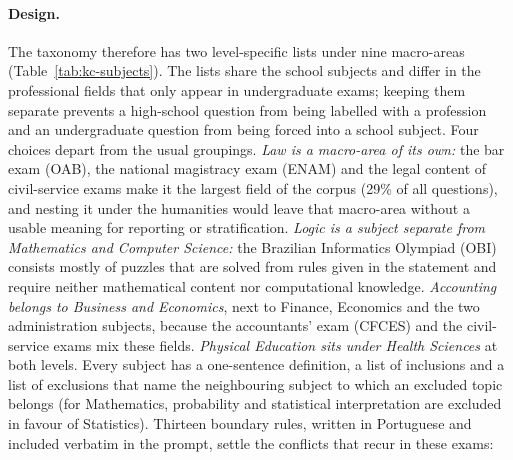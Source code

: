 \paragraph{Design.} The taxonomy therefore has two level-specific lists under
nine macro-areas (Table~\ref{tab:kc-subjects}). The lists share the school
subjects and differ in the professional fields that only appear in
undergraduate exams; keeping them separate prevents a high-school question
from being labelled with a profession and an undergraduate question from
being forced into a school subject. Four choices depart from the usual
groupings. \emph{Law is a macro-area of its own:} the bar exam (OAB), the
national magistracy exam (ENAM) and the legal content of civil-service exams
make it the largest field of the corpus (29\% of all questions), and nesting
it under the humanities would leave that macro-area without a usable meaning
for reporting or stratification. \emph{Logic is a subject separate from
Mathematics and Computer Science:} the Brazilian Informatics Olympiad (OBI)
consists mostly of puzzles that are solved from rules given in the statement
and require neither mathematical content nor computational knowledge.
\emph{Accounting belongs to Business and Economics}, next to Finance,
Economics and the two administration subjects, because the accountants'
exam (CFCES) and the civil-service exams mix these fields. \emph{Physical
Education sits under Health Sciences} at both levels. Every subject has a
one-sentence definition, a list of inclusions and a list of exclusions that
name the neighbouring subject to which an excluded topic belongs (for
Mathematics, probability and statistical interpretation are excluded in
favour of Statistics). Thirteen boundary rules, written in Portuguese and
included verbatim in the prompt, settle the conflicts that recur in these
exams:
